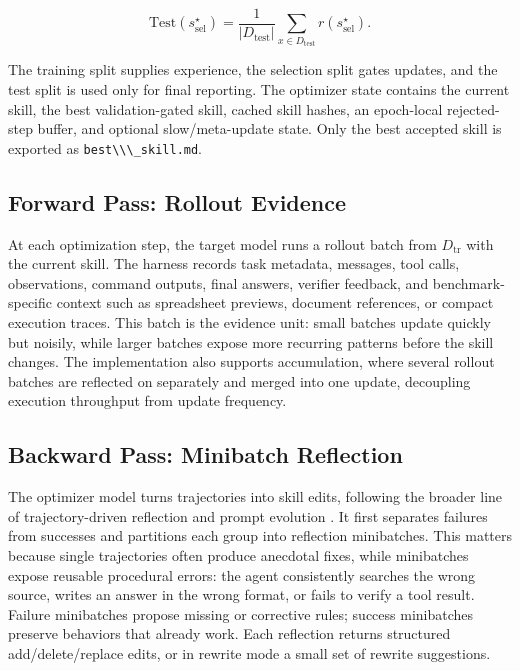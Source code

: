 \documentclass[
]{article}
\newcommand{\passthrough}[1]{#1}
\begin{document}
\[
\mathrm{Test}(s^\star_{\mathrm{sel}})
=
\frac{1}{|D_{\mathrm{test}}|}
\sum_{x \in D_{\mathrm{test}}}
r(s^\star_{\mathrm{sel}}).
\]

The training split supplies experience, the selection split gates
updates, and the test split is used only for final reporting. The
optimizer state contains the current skill, the best validation-gated
skill, cached skill hashes, an epoch-local rejected-step buffer, and
optional slow/meta-update state. Only the best accepted skill is
exported as \passthrough{\lstinline!best\\\_skill.md!}.

\subsection{Forward Pass: Rollout Evidence}\label{sec-method-forward}

At each optimization step, the target model runs a rollout batch from
\(D_{\mathrm{tr}}\) with the current skill. The harness records task
metadata, messages, tool calls, observations, command outputs, final
answers, verifier feedback, and benchmark-specific context such as
spreadsheet previews, document references, or compact execution traces.
This batch is the evidence unit: small batches update quickly but
noisily, while larger batches expose more recurring patterns before the
skill changes. The implementation also supports accumulation, where
several rollout batches are reflected on separately and merged into one
update, decoupling execution throughput from update frequency.

\subsection{Backward Pass: Minibatch
Reflection}\label{sec-method-backward}

The optimizer model turns trajectories into skill edits, following the
broader line of trajectory-driven reflection and prompt evolution
\citep{shinn2023reflexion, madaan2023selfrefine, agrawal2025gepa}. It
first separates failures from successes and partitions each group into
reflection minibatches. This matters because single trajectories often
produce anecdotal fixes, while minibatches expose reusable procedural
errors: the agent consistently searches the wrong source, writes an
answer in the wrong format, or fails to verify a tool result. Failure
minibatches propose missing or corrective rules; success minibatches
preserve behaviors that already work. Each reflection returns structured
add/delete/replace edits, or in rewrite mode a small set of rewrite
suggestions.
\end{document}
